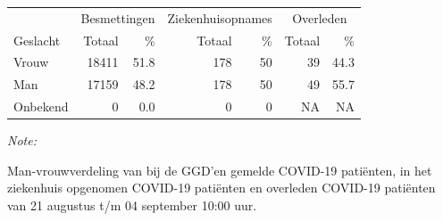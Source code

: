 \documentclass[
  english,
  man,floatsintext]{apa6}
\begin{document}
\begin{table}
\centering\begingroup\fontsize{11}{13}\selectfont

\begin{threeparttable}
\begin{tabular}{lrrrrrr}
\toprule
\multicolumn{1}{c}{ } & \multicolumn{2}{c}{Besmettingen} & \multicolumn{2}{c}{Ziekenhuisopnames} & \multicolumn{2}{c}{Overleden} \\
\cmidrule(l{3pt}r{3pt}){2-3} \cmidrule(l{3pt}r{3pt}){4-5} \cmidrule(l{3pt}r{3pt}){6-7}
Geslacht & Totaal & \% & Totaal & \% & Totaal & \%\\
\midrule
Vrouw & 18411 & 51.8 & 178 & 50 & 39 & 44.3\\
Man & 17159 & 48.2 & 178 & 50 & 49 & 55.7\\
Onbekend & 0 & 0.0 & 0 & 0 & NA & NA\\
\bottomrule
\end{tabular}
\begin{tablenotes}
\item \textit{Note: } 
\item Man-vrouwverdeling van bij de GGD’en gemelde COVID-19 patiënten, in het ziekenhuis opgenomen COVID-19 patiënten en overleden COVID-19 patiënten van 21 augustus t/m 04 september 10:00 uur.
\end{tablenotes}
\end{threeparttable}
\endgroup{}
\end{table}
\newpage
\end{document}
